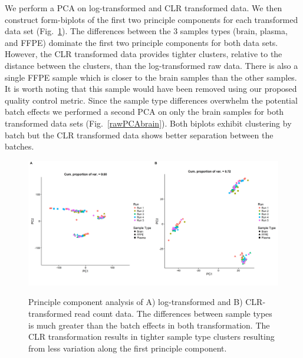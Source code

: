 \documentclass{article}\usepackage[]{graphicx}\usepackage[]{color}
\theoremstyle{definition}
\begin{document}
We perform a PCA on log-transformed and CLR transformed data.  We then construct form-biplots of the first two principle components for each transformed data set (Fig.~\ref{rawPCA}).  The differences between the 3 samples types (brain, plasma, and FFPE) dominate the first two principle components for both data sets.  However, the CLR transformed data provides tighter clusters, relative to the distance between the clusters, than the log-transformed raw data.  There is also a single FFPE sample which is closer to the brain samples than the other samples.  It is worth noting that this sample would have been removed using our proposed quality control metric.  Since the sample type differences overwhelm the potential batch effects we performed a second PCA on only the brain samples for both transformed data sets (Fig.~\ref{rawPCAbrain}).  Both biplots exhibit clustering by batch but the CLR transformed data shows better separation between the batches.  \\

\begin{figure}
\includegraphics[scale=0.4]{./Figures/IO_PCA_2plot}
\label{rawPCA}
\caption{Principle component analysis of A) log-transformed and B) CLR-transformed read count data.  The differences between sample types is much greater than the batch effects in both transformation.  The CLR transformation results in tighter sample type clusters resulting from less variation along the first principle component. }
\end{figure}
\end{document}
